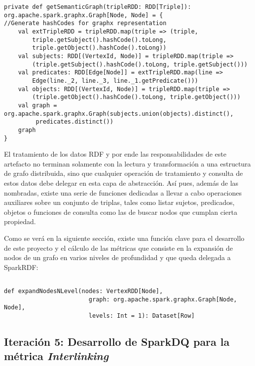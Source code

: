 \lstset{escapechar=@,language=scala}
\begin{lstlisting}[caption={Conversión de RDD de Triplas a Grafo de nodos},captionpos=b, label=graphcomposer]
private def getSemanticGraph(tripleRDD: RDD[Triple]): org.apache.spark.graphx.Graph[Node, Node] = {
//Generate hashCodes for graphx representation
    val extTripleRDD = tripleRDD.map(triple => (triple,
        triple.getSubject().hashCode().toLong,
        triple.getObject().hashCode().toLong))
    val subjects: RDD[(VertexId, Node)] = tripleRDD.map(triple =>
        (triple.getSubject().hashCode().toLong, triple.getSubject()))
    val predicates: RDD[Edge[Node]] = extTripleRDD.map(line =>
        Edge(line._2, line._3, line._1.getPredicate()))
    val objects: RDD[(VertexId, Node)] = tripleRDD.map(triple =>
        (triple.getObject().hashCode().toLong, triple.getObject()))
    val graph = org.apache.spark.graphx.Graph(subjects.union(objects).distinct(),
         predicates.distinct())
    graph
}
\end{lstlisting}

El tratamiento de los datos \acs{RDF} y por ende las responsabilidades de este
artefacto no terminan solamente con la lectura y transformación a una estructura
de grafo distribuida, sino que cualquier operación de tratamiento y consulta de
estos datos debe delegar en esta capa de abstracción. Así pues, además de las
nombradas, existe una serie de funciones dedicadas a llevar a cabo operaciones
auxiliares sobre un conjunto de triplas, tales como listar sujetos, predicados,
objetos o funciones de consulta como las de buscar nodos que cumplan cierta
propiedad. 

Como se verá en la siguiente sección, existe una función clave para el
desarrollo de este proyecto y el cálculo de las métricas que consiste en la
expansión de nodos de un grafo en varios niveles de profundidad y que queda delegada a
SparkRDF:

\lstset{escapechar=@,language=scala}
\begin{lstlisting}[caption={Conversión de RDD de Triplas a Grafo de
      nodos},captionpos=b, label=headerexpand]

def expandNodesNLevel(nodes: VertexRDD[Node],
                        graph: org.apache.spark.graphx.Graph[Node, Node],
                        levels: Int = 1): Dataset[Row]   
\end{lstlisting}


\subsection{Iteración 5: Desarrollo de SparkDQ para la métrica \textit{Interlinking}}
\label{iteracion5}


